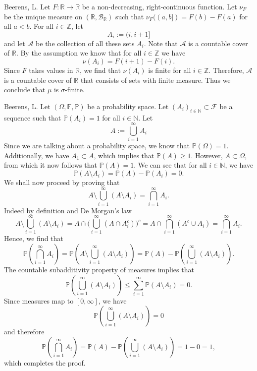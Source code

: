 \begin{solution}[3.21]{Beerens, L.}
    Let $F:\mathbb{R}\rightarrow\mathbb{R}$ be a non-decreasing, right-continuous function. Let $\nu_F$ be the unique measure on $(\mathbb{R},\mathcal{B}_\mathbb{R})$ such that $\nu_F((a,b])=F(b)-F(a)$ for all $a<b$. For all $i\in\mathbb{Z}$, let
    $$
        A_i:= (i,i+1]
    $$
    and let $\mathcal{A}$ be the collection of all these sets $A_i$. Note that $\mathcal{A}$ is a countable cover of $\mathbb{R}$. By the assumption we know that for all $i\in\mathbb{Z}$ we have
    $$
        \nu(A_i)  = F(i+1) - F(i).
    $$
    Since $F$ takes values in $\mathbb{R}$, we find that $\nu(A_i)$ is finite for all $i\in\mathbb{Z}$. Therefore, $\mathcal{A}$ is a countable cover of $\mathbb{R}$ that consists of sets with finite measure. Thus we conclude that $\mu$ is $\sigma$-finite.
\end{solution}

\begin{solution}[3.22]{Beerens, L.}
    Let $(\Omega, \mathbb{F}, \mathbb{P})$ be a probability space. Let $(A_i)_{i\in\mathbb{N}}\subset\mathcal{F}$ be a sequence such that $\mathbb{P}(A_i) = 1$ for all $i\in\mathbb{N}$. Let
    $$
        A:=\bigcup_{i=1}^\infty A_i
    $$
    Since we are talking about a probability space, we know that $\mathbb{P}(\Omega) = 1$. Additionally, we have $A_1\subset A$, which implies that $\mathbb{P}(A)\geq 1$. However, $A\subset \Omega$, from which it now follows that $\mathbb{P}(A) = 1$. We can see that for all $i\in\mathbb{N}$, we have
    $$
        \mathbb{P}(A\setminus A_i) = \mathbb{P}(A) - \mathbb{P}(A_i) = 0.
    $$
    We shall now proceed by proving that 
    $$
        A\setminus\bigcup_{i=1}^\infty(A\setminus A_i) = \bigcap_{i=1}^\infty A_i.
    $$
   Indeed by definition and De Morgan's law
   \begin{equation*}
    A\setminus\bigcup_{i=1}^\infty(A\setminus A_i) = A\cap \Big(\bigcup_{i=1}^\infty(A \cap A_i^c) \Big)^c = A \cap \bigcap_{i=1}^\infty (A^c \cup A_i) = \bigcap_{i=1}^\infty  A_i.
   \end{equation*}
    Hence, we find that
    $$
        \mathbb{P}\left( \bigcap_{i=1}^\infty A_i \right) = \mathbb{P}\left( A\setminus\bigcup_{i=1}^\infty(A\setminus A_i) \right) = \mathbb{P}(A) - \mathbb{P}\left( \bigcup_{i=1}^\infty(A\setminus A_i) \right).
    $$
    The countable subadditivity property of measures implies that
    $$
        \mathbb{P}\left( \bigcup_{i=1}^\infty(A\setminus A_i) \right)\leq\sum_{i=1}^\infty \mathbb{P}(A\setminus A_i)=0.
    $$
    Since measures map to $[0,\infty]$, we have
    $$
        \mathbb{P}\left( \bigcup_{i=1}^\infty(A\setminus A_i) \right)=0
    $$
    and therefore
    $$
        \mathbb{P}\left( \bigcap_{i=1}^\infty A_i \right) = \mathbb{P}(A) - \mathbb{P}\left( \bigcup_{i=1}^\infty(A\setminus A_i) \right) = 1-0=1,
    $$
    which completes the proof.
  \end{solution}

